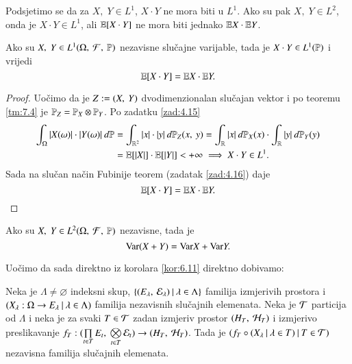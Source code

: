 Podsjetimo se da za $X, \; Y \in L^1$, $X \cdot Y$ ne mora biti u $L^1$. Ako su pak $X, \; Y \in L^2$, onda je $X \cdot Y \in L^1$, ali $\mathbb{E} [X \cdot Y]$ ne mora biti jednako $\mathbb{E} X \cdot \mathbb{E} Y$.

\begin{tm}  \label{tm:7.7}
    Ako su $X, \; Y \in L^1 (\Omega, \: \mathcal{F}, \: \mathbb{P})$ nezavisne slu\v cajne varijable, tada je $X \cdot Y \in L^1(\mathbb{P})$ i vrijedi
    \begin{equation*}
        \mathbb{E} [X \cdot Y] = \mathbb{E} X \cdot \mathbb{E} Y.
    \end{equation*}
\end{tm}

\begin{proof}
    Uo\v cimo da je $Z:=({X}, \: {Y})$ dvodimenzionalan slu\v cajan vektor i po teoremu \ref{tm:7.4} je $\mathbb{P}_Z = \mathbb{P}_X \otimes \mathbb{P}_Y$.
    Po zadatku \ref{zad:4.15}
    \begin{align*}
        \int_\Omega |X(\omega)| \cdot |Y(\omega)| \: d \mathbb{P}
        &= \int_{\mathbb{R}^2} |x| \cdot |y| \: d \mathbb{P}_Z ({x}, \: {y}) = \int_{\mathbb{R}} |x| \: d \mathbb{P}_X (x) \cdot \int_{\mathbb{R}} |y| \: d \mathbb{P}_Y (y)\\
        &= \mathbb{E} [|X|] \cdot \mathbb{E} [|Y|] < +\infty \implies X \cdot Y \in L^1.
    \end{align*}
    Sada na slu\v can na\v cin Fubinije teorem (zadatak \ref{zad:4.16}) daje
    \begin{equation*}
        \mathbb{E} [X \cdot Y] = \mathbb{E} X \cdot \mathbb{E} Y.
    \end{equation*}
\end{proof}

\begin{zad} \label{zad:7.8}
    Ako su $X, \; Y \in L^2 (\Omega, \: \mathcal{F}, \: \mathbb{P})$ nezavisne, tada je
    \begin{equation*}
        \mathrm{Var} (X + Y) = \mathrm{Var} X + \mathrm{Var} Y.
    \end{equation*}
\end{zad}

Uo\v cimo da sada direktno iz korolara \ref{kor:6.11} direktno dobivamo:

\begin{kor} \label{kor:7.9}
    Neka je $\Lambda \neq  \varnothing$ indeksni skup, $\{{({E_\lambda}, \: {\mathcal{E}_\lambda})} \: | \: {\lambda \in \Lambda}\}$ familija izmjerivih prostora i $({X_\lambda : \Omega \to E_\lambda} \: | \: {\lambda \in \Lambda})$ familija nezavisnih slu\v cajnih elemenata.
    Neka je $\mathcal{T}$ particija od $\Lambda$ i neka je za svaki $T \in \mathcal{T}$ zadan izmjeriv prostor $({H_T}, \: {\mathcal{H}_T})$ i izmjerivo preslikavanje $f_T : ({\prod\limits_{t \in T}^{} E_t}, \: {\bigotimes\limits_{t \in T}^{} \mathcal{E}_t}) \to ({H_T}, \: {\mathcal{H}_T})$.
    Tada je $({f_T \circ ({X_\lambda} \: | \: {\lambda \in T})} \: | \: {T \in \mathcal{T}})$ nezavisna familija slu\v cajnih elemenata.
\end{kor}

